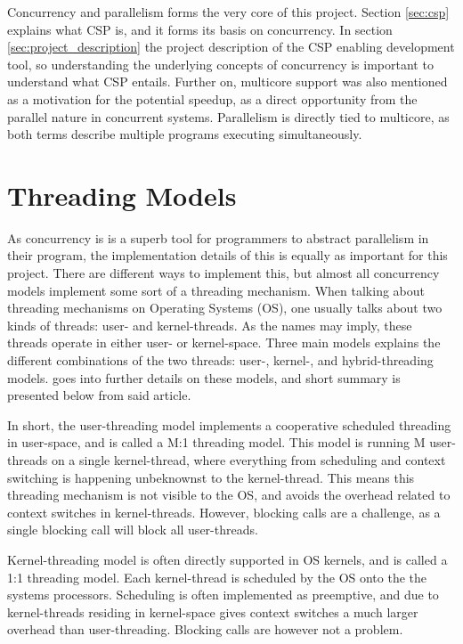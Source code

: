 Concurrency and parallelism forms the very core of this project. Section \ref{sec:csp} explains what CSP is, and it forms its basis on concurrency. In section \ref{sec:project_description} the project description of the CSP enabling development tool, so understanding the underlying concepts of concurrency is important to understand what CSP entails. Further on, multicore support was also mentioned as a motivation for the potential speedup, as a direct opportunity from the parallel nature in concurrent systems. Parallelism is directly tied to multicore, as both terms describe multiple programs executing simultaneously. 


\section{Threading Models}
\label{sec:threadingmodels}

As concurrency is is a superb tool for programmers to abstract parallelism in their program, the implementation details of this is equally as important for this project. There are different ways to implement this, but almost all concurrency models implement some sort of a threading mechanism. When talking about threading mechanisms on Operating Systems (OS), one usually talks about two kinds of threads: user- and kernel-threads. As the names may imply, these threads operate in either user- or kernel-space. Three main models explains the different combinations of the two threads: user-, kernel-, and hybrid-threading models. \citet{c++csp2} goes into further details on these models, and short summary is presented below from said article.

In short, the user-threading model implements a cooperative scheduled threading in user-space, and is called a M:1 threading model. This model is running M user-threads on a single kernel-thread, where everything from scheduling and context switching is happening unbeknownst to the kernel-thread. This means this threading mechanism is not visible to the OS, and avoids the overhead related to context switches in kernel-threads. However, blocking calls are a challenge, as a single blocking call will block all user-threads.

Kernel-threading model is often directly supported in OS kernels, and is called a 1:1 threading model. Each kernel-thread is scheduled by the OS onto the the systems processors. Scheduling is often implemented as preemptive, and due to kernel-threads residing in kernel-space gives context switches a much larger overhead than user-threading. Blocking calls are however not a problem. 


